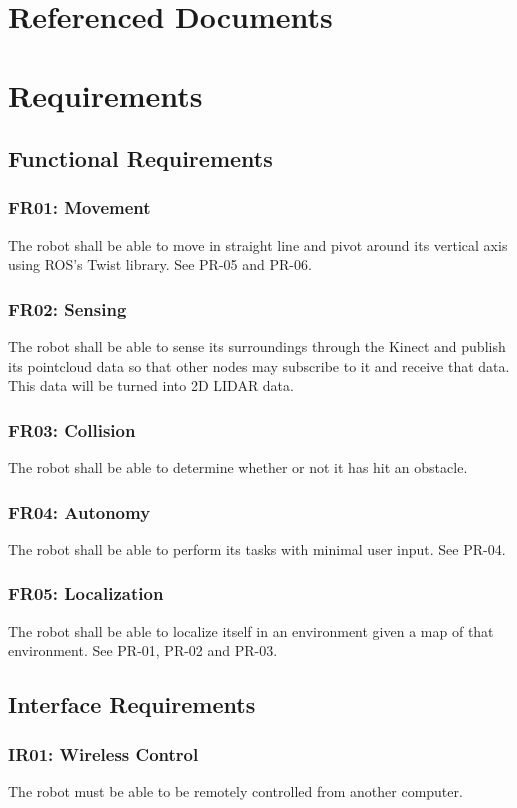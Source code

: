 \documentclass{article}
\begin{document}
\section{Referenced Documents}



\section{Requirements}\label{fig:reqs}
\subsection{Functional Requirements}
\subsubsection{FR01: Movement}
The robot shall be able to move in straight line and pivot around its vertical axis using ROS’s Twist library. See PR-05 and PR-06.
\subsubsection{FR02: Sensing}
The robot shall be able to sense its surroundings through the Kinect and publish its pointcloud data so that other nodes may subscribe to it and receive that data. This data will be turned into 2D LIDAR data.
\subsubsection{FR03: Collision}
The robot shall be able to determine whether or not it has hit an obstacle.
\subsubsection{FR04: Autonomy}
The robot shall be able to perform its tasks with minimal user input. See PR-04.
\subsubsection{FR05: Localization}
The robot shall be able to localize itself in an environment given a map of that environment. See PR-01, PR-02 and PR-03.

\subsection{Interface Requirements}
\subsubsection{IR01: Wireless Control}
The robot must be able to be remotely controlled from another computer.
\end{document}
